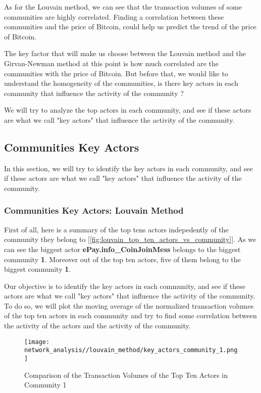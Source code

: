 \documentclass[a4paper, 12pt]{article}
\begin{document}
As for the Louvain method, we can see that the transaction volumes of some communities are highly correlated.
Finding a correlation between these communities and the price of Bitcoin, could help us predict the trend of the price of Bitcoin.

The key factor that will make us choose between the Louvain method and the Girvan-Newman method at this point is 
how much correlated are the communities with the price of Bitcoin. But before that, we would like to understand the homogeneity of the communities,
is there key actors in each community that influence the activity of the community ?

We will try to analyze the top actors in each community, and see if these actors are what we call "key actors" that influence 
the activity of the community.


\newpage

\subsection{Communities Key Actors}
In this section, we will try to identify the key actors in each community, and see if these actors are what we call "key actors" that influence the activity of the community.

\subsubsection{Communities Key Actors: Louvain Method}

First of all, here is a summary of the top tens actors indepedently of the community they belong to [\ref{fig:louvain_top_ten_actors_vs_community}].
As we can see the biggest actor \textbf{ePay.info\_CoinJoinMess} belongs to the biggest community \textbf{1}.
Moreover out of the top ten actors, five of them belong to the biggest community \textbf{1}.

Our objective is to identify the key actors in each community, and see if these actors are what we call "key actors" that influence the activity of the community.
To do so, we will plot the moving average of the normalized transaction volumes of the top ten actors in each community and try to find some correlation between the activity of the actors and the activity of the community.


\begin{figure}[h]
    \centering
    \texttt{[image: network\_analysis//louvain\_method/key\_actors\_community\_1.png]}
    \caption{Comparison of the Transaction Volumes of the Top Ten Actors in Community 1}
\end{figure}
\end{document}
